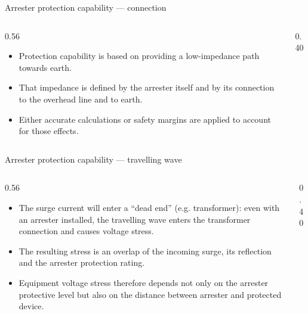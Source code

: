 \begin{frame}{Arrester protection capability --- connection}
  \begin{columns}[c,onlytextwidth]
    \begin{column}{0.56\textwidth}
      \begin{itemize}
        \setlength{\itemsep}{0.4em}
        \item Protection capability is based on providing a low-impedance
              path towards earth.
        \item That impedance is defined by the arrester itself and by its
              connection to the overhead line and to earth.
        \item Either accurate calculations or safety margins are applied to
              account for those effects.
      \end{itemize}
    \end{column}
    \begin{column}{0.40\textwidth}
      \centering
    \end{column}
  \end{columns}
\end{frame}

\begin{frame}{Arrester protection capability --- travelling wave}
  \begin{columns}[c,onlytextwidth]
    \begin{column}{0.56\textwidth}
      \begin{itemize}
        \setlength{\itemsep}{0.4em}
        \item The surge current will enter a ``dead end'' (e.g. transformer):
              even with an arrester installed, the travelling wave enters the
              transformer connection and causes voltage stress.
        \item The resulting stress is an overlap of the incoming surge, its
              reflection and the arrester protection rating.
        \item Equipment voltage stress therefore depends not only on the
              arrester protective level but also on the distance between
              arrester and protected device.
      \end{itemize}
    \end{column}
    \begin{column}{0.40\textwidth}
      \centering
    \end{column}
  \end{columns}
\end{frame}

